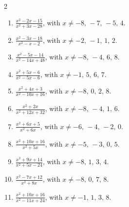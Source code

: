 \documentclass[11pt,oneside]{book}
\begin{document}
\begin{multicols}{2}
\begin{enumerate}[leftmargin=*,label=\textbf{K\arabic*.},itemsep=0.45\baselineskip]
\item $\displaystyle \frac{x^{2} - 2 x - 15}{x^{2} + 3 x - 28}$, with $x\ne -8,\,-7,\,-5,\,4$.
\item $\displaystyle \frac{x^{2} - 3 x - 18}{x^{2} - x - 2}$, with $x\ne -2,\,-1,\,1,\,2$.
\item $\displaystyle \frac{x^{2} - 5 x - 14}{x^{2} - 14 x + 48}$, with $x\ne -8,\,-4,\,6,\,8$.
\item $\displaystyle \frac{x^{2} + 5 x - 6}{x^{2} - 5 x - 6}$, with $x\ne -1,\,5,\,6,\,7$.
\item $\displaystyle \frac{x^{2} + 4 x + 3}{x^{2} - 10 x + 16}$, with $x\ne -8,\,0,\,2,\,8$.
\item $\displaystyle \frac{x^{2} + 2 x}{x^{2} + 12 x + 32}$, with $x\ne -8,\,-4,\,1,\,6$.
\item $\displaystyle \frac{x^{2} + 6 x + 5}{x^{2} + 6 x}$, with $x\ne -6,\,-4,\,-2,\,0$.
\item $\displaystyle \frac{x^{2} + 10 x + 16}{x^{2} + 5 x}$, with $x\ne -5,\,-3,\,0,\,5$.
\item $\displaystyle \frac{x^{2} + 9 x + 14}{x^{2} + 5 x - 24}$, with $x\ne -8,\,1,\,3,\,4$.
\item $\displaystyle \frac{x^{2} - 7 x + 12}{x^{2} + 8 x}$, with $x\ne -8,\,0,\,7,\,8$.
\item $\displaystyle \frac{x^{2} + 10 x + 16}{x^{2} - 11 x + 24}$, with $x\ne -1,\,1,\,3,\,8$.
\end{enumerate}
\end{multicols}
\end{document}

